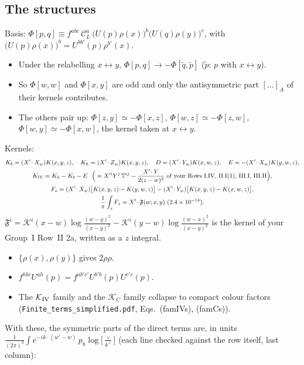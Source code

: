 \documentclass[10pt]{article}
\numberwithin{equation}{section}
\newcommand{\KK}{\mathcal K}
\newcommand{\CL}{\mathcal C_L}
\newcommand{\Lv}{\log\Big[\frac{\vee}{k^+}\Big]}
\newcommand{\pre}{\frac{1}{(2\pi)^3}}
\newcommand{\phw}{e^{-ik\cdot(w'-w)}}
\begin{document}
\subsection{The structures}
Basis: $\Phi[p,q]\equiv f^{abc}\,\CL^a\,\big(U(p)\rho(x)\big)^b\big(U(q)\rho(y)\big)^c$, with $\big(U(p)\rho(x)\big)^b=U^{bb'}(p)\rho^{b'}(x)$.
\begin{itemize}
\item Under the relabelling $x\leftrightarrow y$, $\Phi[p,q]\to-\Phi[\tilde q,\tilde p]$ ($\tilde p$: $p$ with $x\leftrightarrow y$).
\item So $\Phi[w,w]$ and $\Phi[x,y]$ are odd and only the antisymmetric part $[\dots]_A$ of their kernels contributes.
\item The others pair up: $\Phi[z,y]\simeq-\Phi[x,z]$, $\Phi[w,z]\simeq-\Phi[z,w]$, $\Phi[w,y]\simeq-\Phi[x,w]$, the kernel taken at $x\leftrightarrow y$.
\end{itemize}
Kernels:
\begin{gather*}
K_b=(X'\!\cdot X_w)K(x,y,z),\quad K_h=(X'\!\cdot Z_w)K(x,y,z),\quad D=(X'\!\cdot Y_w)K(x,w,z),\quad E=-(X'\!\cdot X_w)K(y,w,z),\\
K_{\rm IV}=K_h-K_b-E\ \ \Big(=X'^iY^j\,\mathbb T^{ij}-\frac{X'\!\cdot Y}{2(z-w)^2}\text{ of your Rows I.IV, II.I(1), III.I, III.II}\Big),\\
F_z=(X'\!\cdot X_w)\big[K(x,y,z)-K(y,w,z)\big]-(X'\!\cdot Y_w)\big[K(x,y,z)-K(x,w,z)\big],\\
\frac1\pi\int_zF_z=X'\!\cdot\mathfrak F(w;x,y)\ \text{($2.4\times10^{-14}$)}.
\end{gather*}
$\mathfrak F^i=\KK^i(x-w)\log\frac{(w-y)^2}{(x-y)^2}-\KK^i(y-w)\log\frac{(w-x)^2}{(x-y)^2}$ is the kernel of your Group~I Row~II 2a, written as a $z$ integral.
\begin{itemize}
\item $\{\rho(x),\rho(y)\}$ gives $2\rho\rho$.
\item $f^{hbc}U^{ah}(p)=f^{ab'c'}U^{b'b}(p)U^{c'c}(p)$.
\item The $\KK_{\rm IV}$ family and the $\KK_C$ family collapse to compact colour factors (\texttt{Finite\_terms\_simplified.pdf}, Eqs.~(famIVs), (famCs)).
\end{itemize}
With these, the symmetric parts of the direct terms are, in units $\pre\int\phw\,p_8\Lv$ (each line checked against the row itself, last column):
\end{document}
